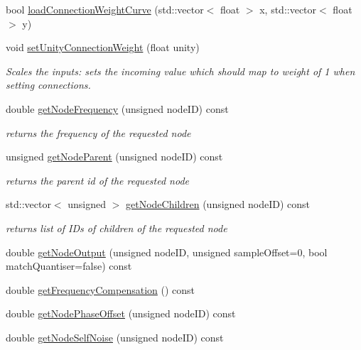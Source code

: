 \begin{DoxyCompactItemize}
\item 
bool \mbox{\hyperlink{classMatsuokaEngine_ad05eb51876bee90334426757a981139b}{load\+Connection\+Weight\+Curve}} (std\+::vector$<$ float $>$ x, std\+::vector$<$ float $>$ y)
\item 
void \mbox{\hyperlink{classMatsuokaEngine_aa7254e0141ad5763ff6267a8430b30ab}{set\+Unity\+Connection\+Weight}} (float unity)
\begin{DoxyCompactList}\small\item\em Scales the inputs\+: sets the incoming value which should map to weight of 1 when setting connections. \end{DoxyCompactList}\item 
double \mbox{\hyperlink{classMatsuokaEngine_a88d27453816ff152b17b6e744979e994}{get\+Node\+Frequency}} (unsigned node\+ID) const
\begin{DoxyCompactList}\small\item\em returns the frequency of the requested node \end{DoxyCompactList}\item 
unsigned \mbox{\hyperlink{classMatsuokaEngine_a5d808db0af62f65826f0fcbc47625205}{get\+Node\+Parent}} (unsigned node\+ID) const
\begin{DoxyCompactList}\small\item\em returns the parent id of the requested node \end{DoxyCompactList}\item 
std\+::vector$<$ unsigned $>$ \mbox{\hyperlink{classMatsuokaEngine_a8eb45ab4f1c523f979b3d44dd2c5e508}{get\+Node\+Children}} (unsigned node\+ID) const
\begin{DoxyCompactList}\small\item\em returns list of I\+Ds of children of the requested node \end{DoxyCompactList}\item 
double \mbox{\hyperlink{classMatsuokaEngine_a72ba599f12e55273f7298a70e7f0eff7}{get\+Node\+Output}} (unsigned node\+ID, unsigned sample\+Offset=0, bool match\+Quantiser=false) const
\item 
double \mbox{\hyperlink{classMatsuokaEngine_a87b0d0b8fe0447fba1fe7456dbea4e11}{get\+Frequency\+Compensation}} () const
\item 
double \mbox{\hyperlink{classMatsuokaEngine_a201de701852d315d3eac20c749b19752}{get\+Node\+Phase\+Offset}} (unsigned node\+ID) const
\item 
double \mbox{\hyperlink{classMatsuokaEngine_a6857e20e39f058a4145fdc4493df6583}{get\+Node\+Self\+Noise}} (unsigned node\+ID) const

\end{DoxyCompactItemize}
